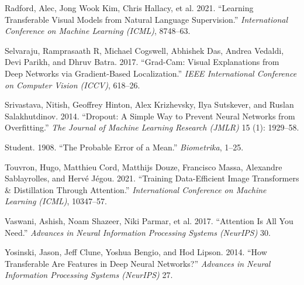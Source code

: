 \documentclass[conference,10pt]{IEEEtran}
\newlength{\cslhangindent}
\newenvironment{CSLReferences}[2] %
 {\begin{list}{}{%
  \setlength{\itemindent}{0pt}
  \setlength{\leftmargin}{0pt}
  \setlength{\parsep}{0pt}
  \ifodd #1
   \setlength{\leftmargin}{\cslhangindent}
   \setlength{\itemindent}{-1\cslhangindent}
  \fi
  \setlength{\itemsep}{#2\baselineskip}}}
 {\end{list}}
\begin{document}
\begin{CSLReferences}{1}{1}
{Radford, Alec, Jong Wook Kim, Chris Hallacy, et al.} 2021. {``Learning
Transferable Visual Models from Natural Language Supervision.''}
\emph{International Conference on Machine Learning (ICML)}, 8748--63.

Selvaraju, Ramprasaath R, Michael Cogswell, Abhishek Das, Andrea
Vedaldi, Devi Parikh, and Dhruv Batra. 2017. {``Grad-Cam: Visual
Explanations from Deep Networks via Gradient-Based Localization.''}
\emph{IEEE International Conference on Computer Vision (ICCV)}, 618--26.

Srivastava, Nitish, Geoffrey Hinton, Alex Krizhevsky, Ilya Sutskever,
and Ruslan Salakhutdinov. 2014. {``Dropout: A Simple Way to Prevent
Neural Networks from Overfitting.''} \emph{The Journal of Machine
Learning Research (JMLR)} 15 (1): 1929--58.

Student. 1908. {``The Probable Error of a Mean.''} \emph{Biometrika},
1--25.

Touvron, Hugo, Matthieu Cord, Matthijs Douze, Francisco Massa, Alexandre
Sablayrolles, and Hervé Jégou. 2021. {``Training Data-Efficient Image
Transformers \& Distillation Through Attention.''} \emph{International
Conference on Machine Learning (ICML)}, 10347--57.

Vaswani, Ashish, Noam Shazeer, Niki Parmar, et al. 2017. {``Attention Is
All You Need.''} \emph{Advances in Neural Information Processing Systems
(NeurIPS)} 30.

Yosinski, Jason, Jeff Clune, Yoshua Bengio, and Hod Lipson. 2014. {``How
Transferable Are Features in Deep Neural Networks?''} \emph{Advances in
Neural Information Processing Systems (NeurIPS)} 27.

\end{CSLReferences}
\end{document}

